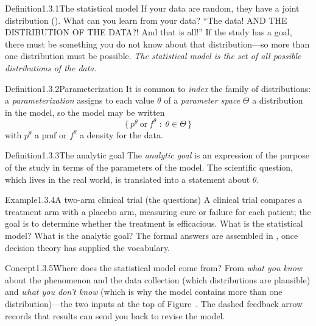 \documentclass[main.tex]{subfiles}
\begin{document}

\begin{Obj}{Definition}{1.3.1}{The statistical model}
If your data are random, they have a joint distribution (). What can you learn from
your data? ``The data! AND THE DISTRIBUTION OF THE DATA?! And that is all!'' If the study
has a goal, there must be something you do not know about that distribution---so more than one
distribution must be possible. \emph{The statistical model is the set of all possible
distributions of the data.} 
\end{Obj}

\begin{Obj}{Definition}{1.3.2}{Parameterization}
It is common to \emph{index} the family of distributions: a \emph{parameterization} assigns to
each value $\theta$ of a \emph{parameter space} $\Theta$ a distribution in the model, so the
model may be written
\[ \{\, p^{\theta}\ \text{or}\ f^{\theta} \;:\; \theta\in\Theta \,\} \]
with $p^{\theta}$ a pmf or $f^{\theta}$ a density for the data.
\end{Obj}

\begin{Obj}{Definition}{1.3.3}{The analytic goal}
The \emph{analytic goal} is an expression of the purpose of the study in terms of the
parameters of the model. The scientific question, which lives in the real world, is translated
into a statement about $\theta$.
\end{Obj}

\begin{ObjL}{Example}{1.3.4}{A two-arm clinical trial (the questions)}
A clinical trial compares a treatment arm with a placebo arm, measuring cure or failure for
each patient; the goal is to determine whether the treatment is efficacious. What is the
statistical model? What is the analytic goal? The formal answers are assembled in
, once decision theory has supplied the vocabulary.
\end{ObjL}

\begin{ObjL}{Concept}{1.3.5}{Where does the statistical model come from?}
From \emph{what you know} about the phenomenon and the data collection (which distributions are
plausible) and \emph{what you don't know} (which is why the model contains more than one
distribution)---the two inputs at the top of Figure~. The dashed feedback arrow
records that results can send you back to revise the model.
\end{ObjL}
\end{document}
